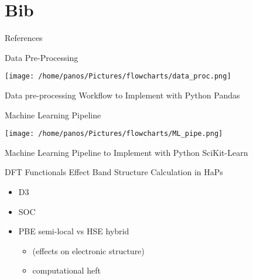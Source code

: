 \documentclass[10pt, aspectratio=169, presentation]{beamer}
\begin{document}
\section{Bib}
\label{sec:orgca11aa3}
\begin{frame}[allowframebreaks]{References}
\AtNextBibliography{\tiny}
\printbibliography
\end{frame}
\appendix
\begin{frame}[label={sec:orgba6575d}]{Data Pre-Processing}
\begin{center}
\texttt{[image: /home/panos/Pictures/flowcharts/data\_proc.png]}
\end{center}
Data pre-processing Workflow to Implement with Python Pandas
\end{frame}
\begin{frame}[label={sec:org1e77e44}]{Machine Learning Pipeline}
\begin{center}
\texttt{[image: /home/panos/Pictures/flowcharts/ML\_pipe.png]}
\end{center}
Machine Learning Pipeline to Implement with Python SciKit-Learn
\end{frame}
\begin{frame}[label={sec:orgba2335f}]{DFT Functionals Effect Band Structure Calculation in HaPs}
\begin{itemize}
\item D3
\item SOC
\item PBE semi-local vs HSE hybrid
\begin{itemize}
\item (effects on electronic structure)
\item computational heft
\end{itemize}
\end{itemize}
\end{frame}
\end{document}
